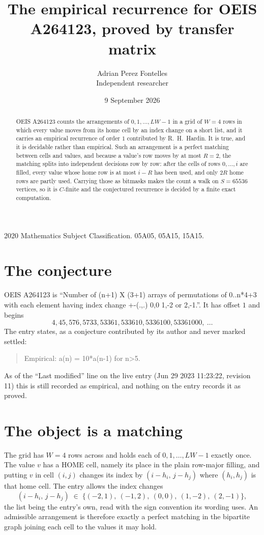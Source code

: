 \documentclass[11pt,a4paper]{article}
\title{The empirical recurrence for OEIS A264123, proved by transfer matrix}
\author{Adrian Perez Fontelles\\ \small Independent researcher}
\date{9 September 2026}
\theoremstyle{plain}
\theoremstyle{definition}
\begin{document}
\maketitle

\begin{abstract}
OEIS A264123 counts the arrangements of $0,1,\dots,LW-1$ in a grid of $W=4$ rows in which
every value moves from its home cell by an index change on a short list, and it carries an
empirical recurrence of order $1$ contributed by R.~H.~Hardin. It is true, and it is
decidable rather than empirical. Such an arrangement is a perfect matching between cells and
values, and because a value's row moves by at most $R=2$, the matching splits into
independent decisions row by row: after the cells of rows $0,\dots,i$ are filled,
every value whose home row is at most $i-R$ has been used, and only $2R$ home rows are
partly used. Carrying those as bitmasks makes the count a walk on $S=65536$ vertices, so it is
$C$-finite and the conjectured recurrence is decided by a finite exact computation.
\end{abstract}

\noindent\small 2020 Mathematics Subject Classification. 05A05, 05A15, 15A15.\normalsize

\section{The conjecture}

OEIS A264123 is ``Number of (n+1) X (3+1) arrays of permutations of 0..n*4+3 with each element having index change +-(.,.) 0,0 1,-2 or 2,-1.''. It has offset $1$ and begins
\[
4, 45, 576, 5733, 53361, 533610, 5336100, 53361000,\ \dots
\]
The entry states, as a conjecture contributed by its author and never marked settled:
\begin{quote}
Empirical: a(n) = 10*a(n-1) for n>5.
\end{quote}
As of the ``Last modified'' line on the live entry (Jun 29 2023 11:23:22, revision 11) this is still
recorded as empirical, and nothing on the entry records it as proved.

\section{The object is a matching}

The grid has $W=4$ rows across and holds each of $0,1,\dots,LW-1$ exactly once. The value
$v$ has a HOME cell, namely its place in the plain row-major filling, and putting $v$ in cell
$(i,j)$ changes its index by $(i-h_i,\,j-h_j)$ where $(h_i,h_j)$ is that home cell. The entry
allows the index changes
\[
(i-h_i,\,j-h_j)\;\in\;\{(-2,1),\ (-1,2),\ (0,0),\ (1,-2),\ (2,-1)\},
\]
the list being the entry's own, read with the sign convention its wording uses. An admissible
arrangement is therefore exactly a perfect matching in the bipartite graph joining each cell to
the values it may hold.
\end{document}
